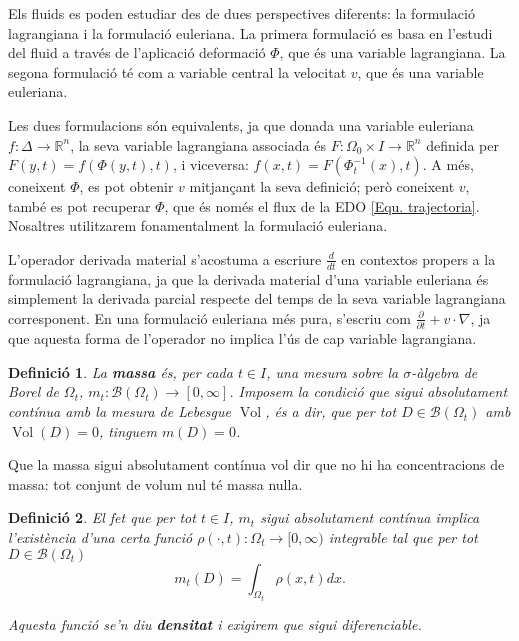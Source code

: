 \documentclass{article}
\numberwithin{equation}{section}
\DeclareMathOperator{\Vol}{Vol}
\newtheorem{definicio}{Definici\'{o}}[section]
\begin{document}
Els fluids es poden estudiar des de dues perspectives diferents: la formulaci\'{o} lagrangiana i la formulaci\'{o} euleriana. La primera formulaci\'{o} es basa en l'estudi del fluid a trav\'{e}s de l'aplicaci\'{o} deformaci\'{o} $\Phi$, que \'{e}s una variable lagrangiana. La segona formulaci\'{o} t\'{e} com a variable central la velocitat $v$, que \'{e}s una variable euleriana.

Les dues formulacions s\'{o}n equivalents, ja que donada una variable euleriana $f:\Delta\rightarrow\mathbb{R}^n$, la seva variable lagrangiana associada \'{e}s $F:\Omega_0\times I\rightarrow\mathbb{R}^n$ definida per $F(y,t)=f(\Phi(y,t),t)$, i viceversa: $f(x,t)=F(\Phi_t^{-1}(x),t)$. A m\'{e}s, coneixent $\Phi$, es pot obtenir $v$ mitjan\c{c}ant la seva definici\'{o}; per\`{o} coneixent $v$, tamb\'{e} es pot recuperar $\Phi$, que \'{e}s nom\'{e}s el flux de la EDO \eqref{Equ. trajectoria}. Nosaltres utilitzarem fonamentalment la formulaci\'{o} euleriana.

L'operador derivada material s'acostuma a escriure $\frac{d}{dt}$ en contextos propers a la formulaci\'{o} lagrangiana, ja que la derivada material d'una variable euleriana \'{e}s simplement la derivada parcial respecte del temps de la seva variable lagrangiana corresponent. En una formulaci\'{o} euleriana m\'{e}s pura, s'escriu com $\frac{\partial}{\partial t}+v\cdot\nabla$, ja que aquesta forma de l'operador no implica l'\'{u}s de cap variable lagrangiana.

\begin{definicio}
La \textbf{massa} \'{e}s, per cada $t\in I$, una mesura sobre la $\sigma$-\`{a}lgebra de Borel de $\Omega_t$, $m_t:\mathcal{B}(\Omega_t)\rightarrow[0,\infty]$. Imposem la condici\'{o} que sigui absolutament cont\'{i}nua amb la mesura de Lebesgue $\Vol$, \'{e}s a dir, que per tot $D\in\mathcal{B}(\Omega_t)$ amb $\Vol(D)=0$, tinguem $m(D)=0$.
\end{definicio}

Que la massa sigui absolutament cont\'{i}nua vol dir que no hi ha concentracions de massa: tot conjunt de volum nul t\'{e} massa nul\textperiodcentered la.

\begin{definicio}
El fet que per tot $t\in I$, $m_t$ sigui absolutament cont\'{i}nua implica l'exist\`{e}ncia d'una certa funci\'{o} $\rho(\cdot,t):\Omega_t\rightarrow[0,\infty)$ integrable tal que per tot $D\in\mathcal{B}(\Omega_t)$
\[m_t(D)=\int_{\Omega_t}\rho(x,t)dx.\]

Aquesta funci\'{o} se'n diu \textbf{densitat} i exigirem que sigui diferenciable.
\end{definicio}
\end{document}
